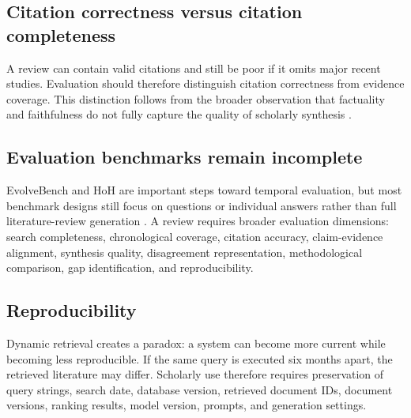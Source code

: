 \documentclass[manuscript,screen]{acmart}
\begin{document}
\subsection{Citation correctness versus citation completeness}\label{subsec:citation-metrics}
A review can contain valid citations and still be poor if it omits major recent studies. Evaluation should therefore
distinguish citation correctness from evidence coverage. This distinction follows from the broader observation
that factuality and faithfulness do not fully capture the quality of scholarly synthesis \cite{maynez2020}.

\subsection{Evaluation benchmarks remain incomplete}\label{subsec:benchmarks}
EvolveBench and HoH are important steps toward temporal evaluation, but most benchmark designs still focus
on questions or individual answers rather than full literature-review generation \cite{zhu2025,ouyang2025}.
A review requires broader evaluation dimensions: search completeness, chronological coverage, citation
accuracy, claim-evidence alignment, synthesis quality, disagreement representation, methodological comparison,
gap identification, and reproducibility.

\subsection{Reproducibility}\label{subsec:reproducibility}
Dynamic retrieval creates a paradox: a system can become more current while becoming less reproducible. If
the same query is executed six months apart, the retrieved literature may differ. Scholarly use therefore
requires preservation of query strings, search date, database version, retrieved document IDs, document
versions, ranking results, model version, prompts, and generation settings.
\end{document}
